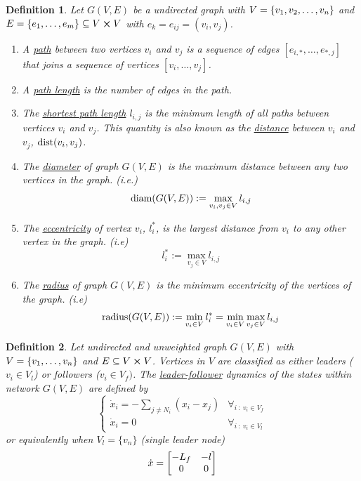 \documentclass[]{article}
\numberwithin{equation}{section}
\newcommand{\st}{\ : \ }
\newtheorem{definition}{Definition}
\newcommand{\diam}{\textnormal{diam}}
\newcommand{\radius}{\textnormal{radius}}
\begin{document}
\begin{definition}\label{def:path_diam_radius_etc}
	Let $G(V,E)$ be a undirected graph with $V = \qty{v_1,v_2,\dots,v_n}$ 
	and $E = \qty{e_1, \dots, e_m} \subseteq V \cross V$ 
	with $e_k = e_{ij} = (v_i, v_j)$.
	\begin{enumerate}
		\item A \emph{\underline{path}} between two vertices $v_i$ and $v_j$ is a sequence of edges $[e_{i, *}, \dots, e_{*, j}]$ that joins a sequence of vertices $[v_i, \dots, v_j]$.
		\item A \emph{\underline{path length}} is the number of edges in the path. 
		\item The \emph{\underline{shortest path length}} $l_{i,j}$ is the minimum length of all paths between vertices $v_i$ and $v_j$. 
		This quantity is also known as the \emph{\underline{distance}} between $v_i$ and $v_j$, $\text{dist}\qty(v_i,v_j)$.
		\item The \emph{\underline{diameter}} of graph $G(V,E)$ is the maximum distance between any two vertices in the graph. 
		(i.e.)\[
			\diam(G(V,E)) := \max_{v_i,v_j \in V} l_{i,j}
		\]
		\item The \emph{\underline{eccentricity}} of vertex $v_i$, $l_{i}^{*}$, is the largest distance from $v_i$ to any other vertex in the graph. 
		(i.e)\[
			l_{i}^{*} := \max_{v_j \in V} l_{i,j}
		\]
		\item The \emph{\underline{radius}} of graph $G(V,E)$ is the minimum eccentricity of the vertices of the graph.
		(i.e)\[
			\radius(G(V,E)) := \min_{v_i \in V} l_{i}^{*} = \min_{v_i \in V} \max_{v_j \in V} l_{i,j}
		\]
	\end{enumerate}
\end{definition}



\begin{definition}\label{def:leader_follower_dynamics}
    Let undirected and unweighted graph $G(V,E)$ with $V = \qty{v_1,\dots,v_n}$ and $E \subseteq V \cross V$.
    Vertices in $V$ are classified as either \emph{leaders} ($v_i \in V_l$) or \emph{followers} ($v_i \in V_f)$. 
	The \emph{\underline{leader-follower}} dynamics of the states within network $G(V,E)$ are defined by\[\begin{cases}
        \dot{x}_i = - \sum_{j \neq N_i} (x_i - x_j) &\forall_{i \st v_i \in V_{f}}\\
        \dot{x}_i =  0 &\forall_{i \st v_i \in V_{l}}
    \end{cases}
	\] or equivalently when $V_{l} = \{v_n\}$ (single leader node) \[
        \dot{x} = \mqty[
            -L_f & - l\\
            0 & 0
        ]
    \]
\end{definition}
\end{document}
